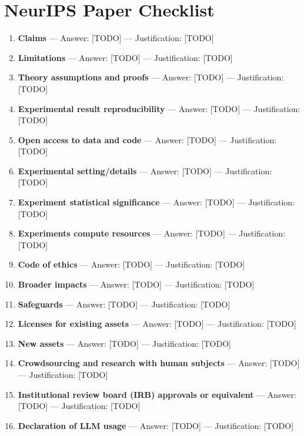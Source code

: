 \documentclass{article}
\begin{document}
\newpage

\section*{NeurIPS Paper Checklist}


\begin{enumerate}
\item \textbf{Claims} --- Answer: [TODO] --- Justification: [TODO]
\item \textbf{Limitations} --- Answer: [TODO] --- Justification: [TODO]
\item \textbf{Theory assumptions and proofs} --- Answer: [TODO] --- Justification: [TODO]
\item \textbf{Experimental result reproducibility} --- Answer: [TODO] --- Justification: [TODO]
\item \textbf{Open access to data and code} --- Answer: [TODO] --- Justification: [TODO]
\item \textbf{Experimental setting/details} --- Answer: [TODO] --- Justification: [TODO]
\item \textbf{Experiment statistical significance} --- Answer: [TODO] --- Justification: [TODO]
\item \textbf{Experiments compute resources} --- Answer: [TODO] --- Justification: [TODO]
\item \textbf{Code of ethics} --- Answer: [TODO] --- Justification: [TODO]
\item \textbf{Broader impacts} --- Answer: [TODO] --- Justification: [TODO]
\item \textbf{Safeguards} --- Answer: [TODO] --- Justification: [TODO]
\item \textbf{Licenses for existing assets} --- Answer: [TODO] --- Justification: [TODO]
\item \textbf{New assets} --- Answer: [TODO] --- Justification: [TODO]
\item \textbf{Crowdsourcing and research with human subjects} --- Answer: [TODO] --- Justification: [TODO]
\item \textbf{Institutional review board (IRB) approvals or equivalent} --- Answer: [TODO] --- Justification: [TODO]
\item \textbf{Declaration of LLM usage} --- Answer: [TODO] --- Justification: [TODO]
\end{enumerate}
\end{document}
